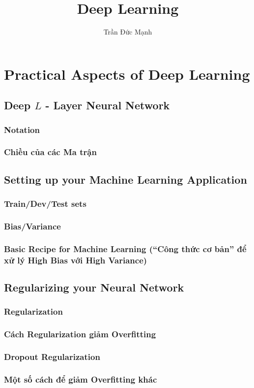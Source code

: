 \documentclass[12pt,a4paper]{report}
\author{Trần Đức Mạnh}
\title{Deep Learning}
\begin{document}
\tableofcontents

\chapter{Practical Aspects of Deep Learning}
	\section{Deep $L$ - Layer Neural Network}
		\subsection{Notation}
		\subsection{Chiều của các Ma trận}
	\section{Setting up your Machine Learning Application}
		\subsection{Train/Dev/Test sets}
		\subsection{Bias/Variance}
		\subsection{Basic Recipe for Machine Learning (“Công thức cơ bản” để xử lý High Bias với High Variance)}
	\section{Regularizing your Neural Network}
		\subsection{Regularization}
		\subsection{Cách Regularization giảm Overfitting}
		\subsection{Dropout Regularization}
		\subsection{Một số cách để giảm Overfitting khác}
\end{document}
